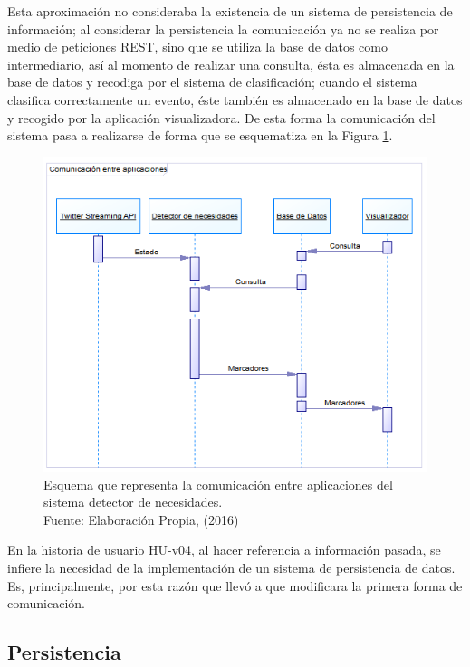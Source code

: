 Esta aproximación no consideraba la existencia de un sistema de persistencia de información; al considerar la persistencia la comunicación ya no se realiza por medio de peticiones REST, sino que se utiliza la base de datos como intermediario, así al momento de realizar una consulta, ésta es almacenada en la base de datos y recodiga por el sistema de clasificación; cuando el sistema clasifica correctamente un evento, éste también es almacenado en la base de datos y recogido por la aplicación visualizadora. De esta forma la comunicación del sistema pasa a realizarse de forma que se esquematiza en la Figura \ref{fig:comunFinal}.

\begin{figure}[H]
	\centering
	\captionsetup{justification=centering}
	\includegraphics[scale=0.8]{images/ComunicacionFinal.png}
	\caption[Esquema que representa la comunicación entre aplicaciones del sistema detector de necesidades.]{Esquema que representa la comunicación entre aplicaciones del sistema detector de necesidades.\\Fuente: Elaboración Propia, (2016)}
	\label{fig:comunFinal}
\end{figure}

En la historia de usuario HU-v04, al hacer referencia a información pasada, se infiere la necesidad de la implementación de un sistema de persistencia de datos. Es, principalmente, por esta razón que llevó a que modificara la primera forma de comunicación.

\subsection{Persistencia}
\label{sec:diseno:persistencia}

